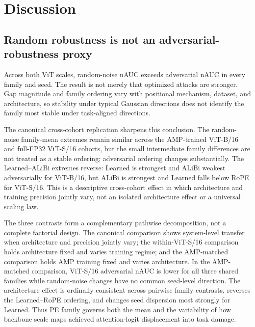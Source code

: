 \documentclass[preprint,12pt,authoryear]{elsarticle}
\begin{document}
\section{Discussion}
\label{sec:discussion}

\subsection{Random robustness is not an adversarial-robustness proxy}

Across both ViT scales, random-noise nAUC exceeds adversarial nAUC in
every family and seed. The result is not merely that optimized attacks
are stronger. Gap magnitude and family ordering vary with positional
mechanism, dataset, and architecture, so stability under typical
Gaussian directions does not identify the family most stable under
task-aligned directions.

The canonical cross-cohort replication sharpens this conclusion. The
random-noise family-mean extremes remain similar across the AMP-trained
ViT-B/16 and full-FP32 ViT-S/16 cohorts, but the small intermediate
family differences are not treated as a stable ordering; adversarial ordering
changes substantially. The Learned--ALiBi extremes reverse:
Learned is strongest and ALiBi weakest adversarially for ViT-B/16, but
ALiBi is strongest and Learned falls below RoPE for ViT-S/16. This is a descriptive cross-cohort effect in which architecture and
training precision jointly vary, not an isolated architecture effect or a
universal scaling law.

The three contrasts form a complementary pathwise decomposition, not a complete
factorial design. The canonical
comparison shows system-level transfer when architecture and precision
jointly vary; the within-ViT-S/16 comparison holds architecture fixed and
varies training regime; and the AMP-matched comparison holds AMP training
fixed and varies architecture. In the AMP-matched comparison,
ViT-S/16 adversarial nAUC is lower for all three shared families while
random-noise changes have no common seed-level direction. The architecture
effect is ordinally consistent across pairwise family contrasts, reverses
the Learned--RoPE ordering, and changes seed dispersion most strongly for
Learned. Thus PE family governs both the mean and the variability of how
backbone scale maps achieved attention-logit displacement into task damage.
\end{document}
